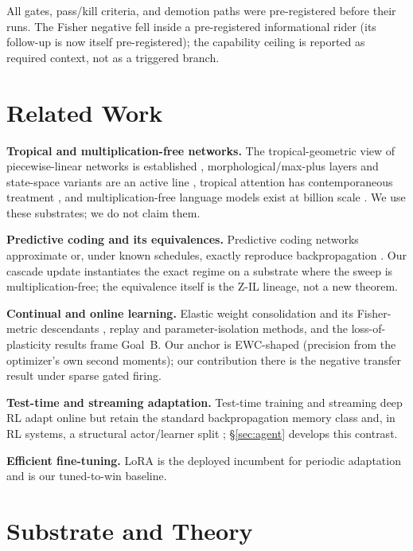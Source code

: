 \documentclass{article}
\begin{document}
All gates, pass/kill criteria, and demotion paths were pre-registered before
their runs. The Fisher negative fell inside a pre-registered informational
rider (its follow-up is now itself pre-registered); the capability ceiling
is reported as required context, not as a triggered branch.

\section{Related Work}
\label{sec:related}

\textbf{Tropical and multiplication-free networks.} The tropical-geometric
view of piecewise-linear networks is established
\citep{zhang2018tropical}, morphological/max-plus layers and state-space
variants are an active line \citep{morpmamba2024}, tropical attention has
contemporaneous treatment \citep{tropicalattention2025}, and
multiplication-free language models exist at billion scale
\citep{zhu2024matmulfree}. We use these substrates; we do not claim them.

\textbf{Predictive coding and its equivalences.} Predictive coding networks
\citep{rao1999predictive,millidge2022predictive} approximate or, under known
schedules, exactly reproduce backpropagation
\citep{whittington2017approximation,song2020can}. Our cascade update
instantiates the exact regime on a substrate where the sweep is
multiplication-free; the equivalence itself is the Z-IL lineage, not a new
theorem.

\textbf{Continual and online learning.} Elastic weight consolidation and its
Fisher-metric descendants \citep{kirkpatrick2017overcoming}, replay and
parameter-isolation methods, and the loss-of-plasticity results
\citep{dohare2024loss} frame Goal~B. Our anchor is EWC-shaped (precision from
the optimizer's own second moments); our contribution there is the negative
transfer result under sparse gated firing.

\textbf{Test-time and streaming adaptation.} Test-time training
\citep{sun2020test} and streaming deep RL \citep{elsayed2024streaming} adapt
online but retain the standard backpropagation memory class and, in RL
systems, a structural actor/learner split \citep{espeholt2018impala,
horgan2018distributed}; \S\ref{sec:agent} develops this contrast.

\textbf{Efficient fine-tuning.} LoRA \citep{hu2022lora} is the deployed
incumbent for periodic adaptation and is our tuned-to-win baseline.

\section{Substrate and Theory}
\label{sec:substrate}
\end{document}
